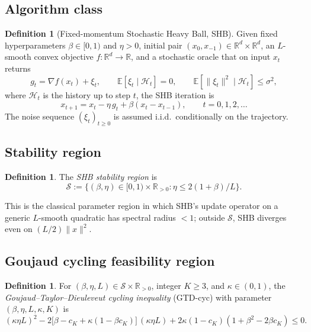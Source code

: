 \documentclass[11pt]{article}
\theoremstyle{definition}
\newtheorem{definition}[theorem]{Definition}
\theoremstyle{remark}
\begin{document}
\subsection{Algorithm class}

\begin{definition}[Fixed-momentum Stochastic Heavy Ball, SHB]
Given fixed hyperparameters $\beta \in [0,1)$ and $\eta > 0$, initial pair $(x_0, x_{-1}) \in \mathbb{R}^d \times \mathbb{R}^d$, an $L$-smooth convex objective $f:\mathbb{R}^d \to \mathbb{R}$, and a stochastic oracle that on input $x_t$ returns
\[
  g_t = \nabla f(x_t) + \xi_t, \qquad \mathbb{E}[\xi_t \mid \mathcal{H}_t] = 0,\qquad \mathbb{E}[\|\xi_t\|^2 \mid \mathcal{H}_t] \leq \sigma^2,
\]
where $\mathcal{H}_t$ is the history up to step $t$, the SHB iteration is
\begin{equation}
  x_{t+1} = x_t - \eta\, g_t + \beta(x_t - x_{t-1}),\qquad t = 0, 1, 2, \ldots \tag{SHB}
\end{equation}
The noise sequence $(\xi_t)_{t\geq 0}$ is assumed i.i.d.\ conditionally on the trajectory.
\end{definition}

\subsection{Stability region}

\begin{definition}
The \emph{SHB stability region} is
\[
  \mathcal{S} := \{(\beta, \eta) \in [0,1) \times \mathbb{R}_{>0} : \eta \leq 2(1 + \beta)/L\}.
\]
\end{definition}

This is the classical parameter region in which SHB's update operator on a generic $L$-smooth quadratic has spectral radius $< 1$; outside $\mathcal{S}$, SHB diverges even on $(L/2)\|x\|^2$.

\subsection{Goujaud cycling feasibility region}

\begin{definition}
For $(\beta, \eta, L) \in \mathcal{S} \times \mathbb{R}_{>0}$, integer $K \geq 3$, and $\kappa \in (0, 1)$, the \emph{Goujaud--Taylor--Dieuleveut cycling inequality} (GTD-cyc) with parameter $(\beta, \eta, L, \kappa, K)$ is
\begin{equation}
  (\kappa \eta L)^2 - 2\big[\beta - c_K + \kappa(1 - \beta c_K)\big]\,(\kappa \eta L) + 2\kappa(1 - c_K)(1 + \beta^2 - 2\beta c_K) \leq 0.\tag{$\star$}
\end{equation}
\end{definition}
\end{document}
